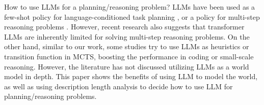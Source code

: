 How to use LLMs for a planning/reasoning problem? LLMs have been used as a few-shot policy for language-conditioned task planning \cite{huang2022language, ahn2022can, huang2022inner}, or a policy for multi-step reasoning problems \cite{wei2022chain, yao2023tree}. However, recent research \cite{dziri2023faith} also suggests that transformer LLMs are inherently limited for solving multi-step reasoning problems. On the other hand, similar to our work, some studies try to use LLMs as heuristics \cite{zhang2023planning} or transition function \cite{hao2023reasoning} in MCTS, boosting the performance in coding or small-scale reasoning. However, the literature has not discussed utilizing LLMs as a world model in depth. This paper shows the benefits of using LLM to model the world, as well as using description length analysis to decide how to use LLM for planning/reasoning problems.



